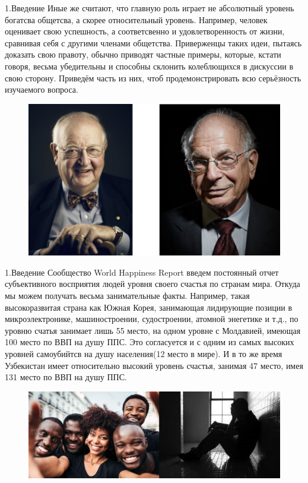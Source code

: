 \documentclass[aspectratio=169]{beamer}
\begin{document}
\begin{frame}{1.Введение}
\small
    Иные же считают, что главную роль играет не абсолютный уровень богатсва общетсва, а скорее относительный уровень. Например, человек оценивает свою успешность, а соответсвенно и удовлетворенность от жизни, сравнивая себя с другими членами общетства. Приверженцы таких идеи, пытаясь доказать свою правоту, обычно приводят частные примеры, которые, кстати говоря, весьма убедительны и способны склонить колеблющихся в дискуссии в свою сторону. Приведём часть из них, чтоб продемонстрировать всю серьёзность изучаемого вопроса. 

    \begin{figure} \label{hompic}
            \centering
            \includegraphics[scale=0.28]{NobleU.png}
    \end{figure}
\end{frame}

\begin{frame}{1.Введение}
\small
   Сообщество World Happiness Report введем постоянный отчет субъективного восприятия людей уровня своего счастья по странам мира. Откуда мы можем получать весьма занимательные факты. Например, такая высокоразвитая страна как Южная Корея, занимающая лидирующие позиции в микроэлектронике, машиностроении, судостроении, атомной энегетике и т.д., по уровню счатья занимает лишь 55 место, на одном уровне с Молдавией, имеющая 100 место по ВВП на душу ППС. Это согласуется и с одним из самых высоких уровней самоубийтсв на душу населения(12 место в мире). И в то же время Узбекистан имеет относительно высокий уровень счастья, занимая 47 место, имея 131 место по ВВП на душу ППС. 
   
   \begin{figure} \label{hompic}
            \centering
            \includegraphics[scale=0.32]{Union1.png}
    \end{figure}

\end{frame}
\end{document}
